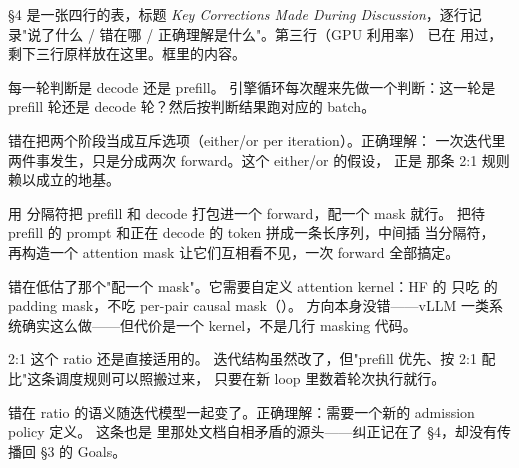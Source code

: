  §4 是一张四行的表，标题 \emph{Key Corrections
Made During Discussion}，逐行记录"说了什么 / 错在哪 / 正确理解是什么"。第三行（GPU 利用率）
已在  用过，剩下三行原样放在这里。框里的内容。

\begin{misconception}{每一轮判断是 decode 还是 prefill。}
引擎循环每次醒来先做一个判断：这一轮是 prefill 轮还是 decode 轮？然后按判断结果跑对应的 batch。
\end{misconception}

\noindent 错在把两个阶段当成互斥选项（either/or per iteration）。正确理解：
一次迭代里两件事发生，只是分成两次 forward。这个 either/or 的假设，
正是  那条 2:1 规则赖以成立的地基。

\begin{misconception}{用  分隔符把 prefill 和 decode 打包进一个 forward，配一个 mask 就行。}
把待 prefill 的 prompt 和正在 decode 的 token 拼成一条长序列，中间插  当分隔符，
再构造一个 attention mask 让它们互相看不见，一次 forward 全部搞定。
\end{misconception}

\noindent 错在低估了那个"配一个 mask"。它需要自定义 attention kernel：HF 的 
只吃 \code{[B, S]} 的 padding mask，不吃 per-pair causal mask（）。
方向本身没错——vLLM 一类系统确实这么做——但代价是一个 kernel，不是几行 masking 代码。

\begin{misconception}{2:1 这个 ratio 还是直接适用的。}
迭代结构虽然改了，但"prefill 优先、按 2:1 配比"这条调度规则可以照搬过来，
只要在新 loop 里数着轮次执行就行。
\end{misconception}

\noindent 错在 ratio 的语义随迭代模型一起变了。正确理解：需要一个新的 admission policy 定义。
这条也是  里那处文档自相矛盾的源头——纠正记在了 §4，却没有传播回 §3 的 Goals。
